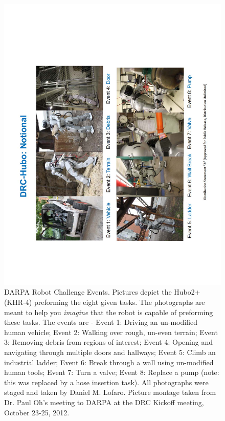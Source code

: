 \begin{figure}[thpb]
  \centering
\includegraphics[height=1.0\columnwidth, angle=-90]{./background/pix/drcEvents.pdf}
  \caption{DARPA Robot Challenge Events.  Pictures depict the Hubo2+ (KHR-4) preforming the eight given tasks.  The photographs are meant to help you \textit{imagine} that the robot is capable of preforming these tasks.  The events are - Event 1: Driving an un-modified human vehicle; Event 2: Walking over rough, un-even terrain; Event 3: Removing debris from regions of interest; Event 4: Opening and navigating through multiple doors and hallways; Event 5: Climb an industrial ladder; Event 6: Break through a wall using un-modified human tools; Event 7: Turn a valve; Event 8: Replace a pump (note: this was replaced by a hose insertion task).  All photographs were staged and taken by Daniel M. Lofaro.  Picture montage taken from Dr. Paul Oh's meeting to DARPA at the DRC Kickoff meeting, October 23-25, 2012.    }
  \label{fig:drcEvents}
\end{figure}


